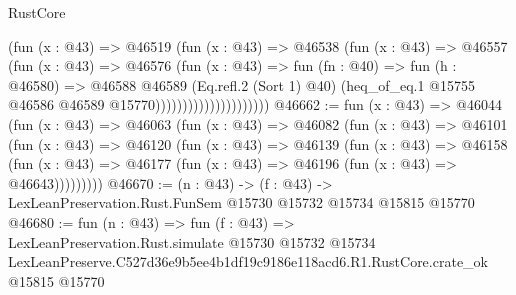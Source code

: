 \begin{lexlean}{RustCore}
\begin{coremodule}
                                  (fun (x : @43) =>
                                  @46519
                                    (fun (x : @43) =>
                                    @46538
                                      (fun (x : @43) =>
                                      @46557
                                        (fun (x : @43) =>
                                        @46576
                                          (fun (x : @43) =>
                                          fun (fn : @40) =>
                                          fun (h : @46580) =>
                                          @46588
                                            @46589
                                            (Eq.refl.{2} (Sort 1) @40)
                                            (heq_of_eq.{1}
                                              @15755
                                              @46586
                                              @46589
                                              @15770)))))))))))))))))))))
@46662 := fun (x : @43) =>
  @46044
    (fun (x : @43) =>
    @46063
      (fun (x : @43) =>
      @46082
        (fun (x : @43) =>
        @46101
          (fun (x : @43) =>
          @46120
            (fun (x : @43) =>
            @46139
              (fun (x : @43) =>
              @46158
                (fun (x : @43) => @46177 (fun (x : @43) => @46196 (fun (x : @43) => @46643)))))))))
@46670 := (n : @43) ->
  (f : @43) -> LexLeanPreservation.Rust.FunSem @15730 @15732 @15734 @15815 @15770
@46680 := fun (n : @43) =>
  fun (f : @43) =>
  LexLeanPreservation.Rust.simulate
    @15730
    @15732
    @15734
    LexLeanPreserve.C527d36e9b5ee4b1df19c9186e118acd6.R1.RustCore.crate_ok
    @15815
    @15770
\end{coremodule}
\end{lexlean}
